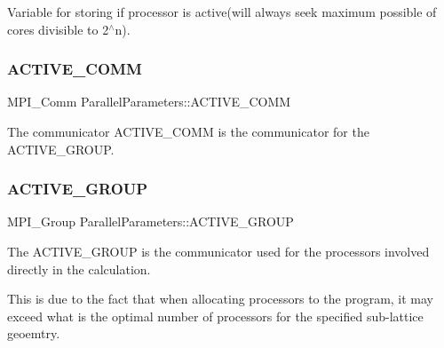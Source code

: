 Variable for storing if processor is active(will always seek maximum possible of cores divisible to 2$^\wedge$n). 

\mbox{\label{class_parallel_1_1_parallel_parameters_aef6da63b4d0247e6e249e64f2ed38ef4}} 
\subsubsection{\texorpdfstring{ACTIVE\_COMM}{ACTIVE\_COMM}}
{\footnotesize\ttfamily M\+P\+I\+\_\+\+Comm Parallel\+Parameters\+::\+A\+C\+T\+I\+V\+E\+\_\+\+C\+O\+MM\hspace{0.3cm}{\ttfamily [static]}}



The communicator A\+C\+T\+I\+V\+E\+\_\+\+C\+O\+MM is the communicator for the A\+C\+T\+I\+V\+E\+\_\+\+G\+R\+O\+UP. 

\mbox{\label{class_parallel_1_1_parallel_parameters_a670452a0f160992cca5c21453cfca71c}} 
\subsubsection{\texorpdfstring{ACTIVE\_GROUP}{ACTIVE\_GROUP}}
{\footnotesize\ttfamily M\+P\+I\+\_\+\+Group Parallel\+Parameters\+::\+A\+C\+T\+I\+V\+E\+\_\+\+G\+R\+O\+UP\hspace{0.3cm}{\ttfamily [static]}}

The A\+C\+T\+I\+V\+E\+\_\+\+G\+R\+O\+UP is the communicator used for the processors involved directly in the calculation.

This is due to the fact that when allocating processors to the program, it may exceed what is the optimal number of processors for the specified sub-\/lattice geoemtry. \mbox{\label{class_parallel_1_1_parallel_parameters_a2297be86fcb257862669b9b40ff74194}} 
